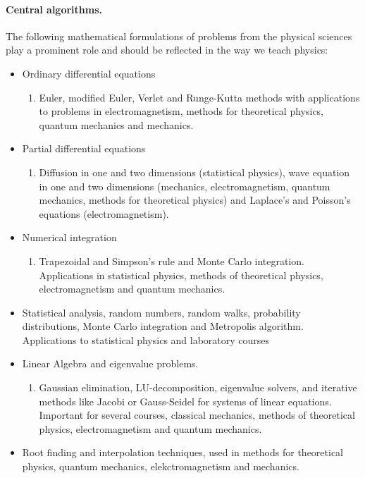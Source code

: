 \documentclass[%
oneside,                 %
final,                   %
10pt]{article}
\begin{document}
\paragraph{Central algorithms.}
The following mathematical formulations of problems from the physical sciences play a prominent role and should be reflected in the way we teach physics:
\begin{itemize}
 \item Ordinary differential equations
\begin{enumerate}

  \item Euler, modified Euler, Verlet and Runge-Kutta methods with applications to problems in electromagnetism, methods for theoretical physics, quantum mechanics and mechanics.

\end{enumerate}

\noindent
 \item Partial differential equations
\begin{enumerate}

  \item Diffusion in one and two dimensions (statistical physics), wave equation in one and two dimensions (mechanics, electromagnetism, quantum mechanics, methods for theoretical physics) and Laplace's and Poisson's equations (electromagnetism).

\end{enumerate}

\noindent
 \item Numerical integration 
\begin{enumerate}

  \item Trapezoidal and Simpson's rule and Monte Carlo integration. Applications in statistical physics, methods of theoretical physics, electromagnetism and quantum mechanics.

\end{enumerate}

\noindent
 \item Statistical analysis, random numbers, random walks, probability distributions, Monte Carlo integration and Metropolis algorithm. Applications to statistical physics and laboratory courses

 \item Linear Algebra and eigenvalue problems. 
\begin{enumerate}

  \item Gaussian elimination, LU-decomposition, eigenvalue solvers, and iterative methods like  Jacobi or Gauss-Seidel for systems of linear equations. Important for several courses, classical mechanics, methods of theoretical physics, electromagnetism and quantum mechanics.

\end{enumerate}

\noindent
 \item Root finding and interpolation techniques, used in methods for theoretical physics, quantum mechanics, elekctromagnetism and mechanics.
\end{itemize}
\end{document}
